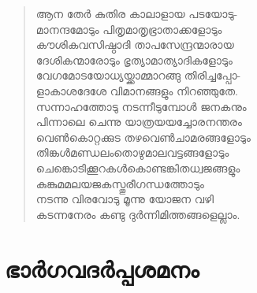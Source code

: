\begin{verse}
ആന തേര്‍ കുതിര കാലാളായ പടയോടു-\\
മാനന്ദമോടും പിതൃമാതൃഭ്രാതാക്കളോടും\\
കൗശികവസിഷ്ഠാദി താപസേന്ദ്രന്മാരായ\\
ദേശികന്മാരോടും ഭൃത്യാമാത്യാദികളോടും\\
വേഗമോടയോധ്യയ്ക്കാമ്മാറങ്ങു തിരിച്ചപ്പോ-\\
ളാകാശദേശേ വിമാനങ്ങളും നിറഞ്ഞുതേ.\\
സന്നാഹത്തോടു നടന്നീടുമ്പോള്‍ ജനകനും\\
പിന്നാലെ ചെന്നു യാത്രയയച്ചോരനന്തരം\\
വെണ്‍കൊറ്റക്കുട തഴവെണ്‍ചാമരങ്ങളോടും\\
തിങ്കള്‍മണ്ഡലംതൊഴുമാലവട്ടങ്ങളോടും\\
ചെങ്കൊടിക്കൂറകള്‍കൊണ്ടങ്കിതധ്വജങ്ങളും\\
കുങ്കുമമലയജകസ്തൂരീഗന്ധത്തോടും\\
നടന്നു വിരവോടു മൂന്നു യോജന വഴി\\
കടന്നനേരം കണ്ടു ദുര്‍ന്നിമിത്തങ്ങളെല്ലാം.
\end{verse}


\section{ഭാര്‍ഗവദര്‍പ്പശമനം}

